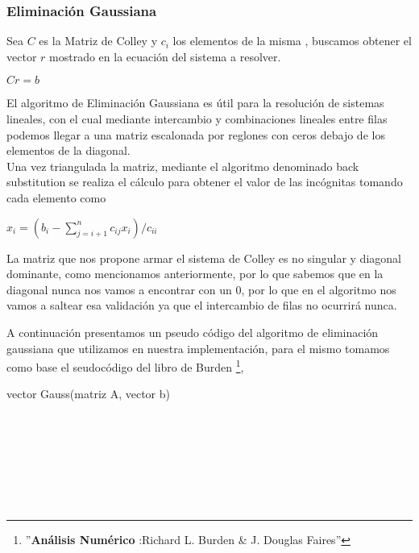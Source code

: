 \subsubsection{Eliminación Gaussiana}
Sea $C$ es la Matriz de Colley y $c_i$ los elementos de la misma , buscamos obtener el vector $r$ mostrado en la ecuación del sistema a resolver. 

\begin{center}
$Cr=b$
\end{center}

El algoritmo de Eliminación Gaussiana es útil para la resolución de sistemas lineales, con el cual mediante intercambio y combinaciones lineales entre filas podemos llegar a una matriz escalonada por reglones con ceros debajo de los elementos de la diagonal.\\
Una vez triangulada la matriz, mediante el algoritmo denominado back substitution se realiza el cálculo para obtener el valor de las incógnitas tomando cada elemento como\\

\begin{center}
$x_i = (b_i - \sum\limits_{j = i + 1}^n c_{ij}x_i) / c_{ii}$ \\
\end{center}

La matriz que nos propone armar el sistema de Colley es no singular y diagonal dominante, como mencionamos anteriormente, por lo que sabemos que en la diagonal nunca nos vamos a encontrar con un 0, por lo que en el algoritmo nos vamos a saltear esa validación ya que el intercambio de filas no ocurrirá nunca.

A continuación presentamos un pseudo código del algoritmo de eliminación gaussiana que utilizamos en nuestra implementación, para el mismo tomamos como base el seudocódigo del libro de Burden \footnote{''\textbf{Análisis Numérico }:Richard L. Burden & J. Douglas Faires''},

\begin{algorithm}
    \begin{algorithmic}[1]\parskip=2mm  
        \caption{vector Gauss(matriz A, vector b)}
        \\
        \\
        \\
        \\
        \\
        \\
    \end{algorithmic}
\end{algorithm}



